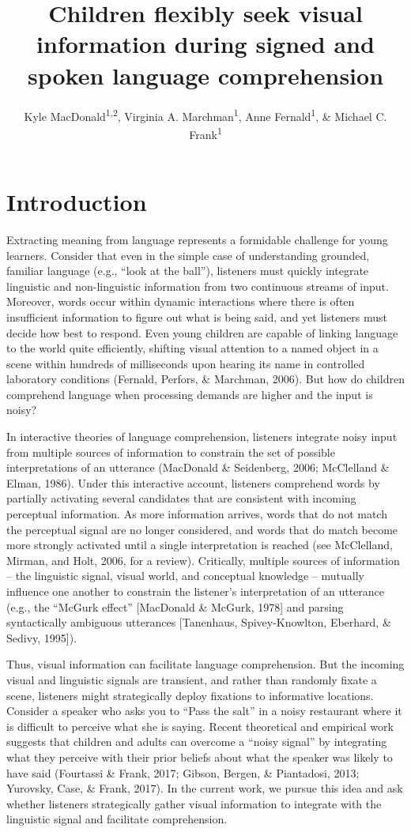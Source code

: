 \documentclass[,man,floatsintext]{apa6}
\title{Children flexibly seek visual information during signed and spoken language comprehension}
\author{Kyle MacDonald\textsuperscript{1,2}, Virginia A. Marchman\textsuperscript{1}, Anne Fernald\textsuperscript{1}, \& Michael C. Frank\textsuperscript{1}}
\date{}
\affiliation{
\vspace{0.5cm}
\textsuperscript{1} Stanford University\\\textsuperscript{2} University of California, Los Angeles}
\begin{document}
\maketitle

\hypertarget{introduction}{%
\section{Introduction}\label{introduction}}

Extracting meaning from language represents a formidable challenge for young learners. Consider that even in the simple case of understanding grounded, familiar language (e.g., \enquote{look at the ball}), listeners must quickly integrate linguistic and non-linguistic information from two continuous streams of input. Moreover, words occur within dynamic interactions where there is often insufficient information to figure out what is being said, and yet listeners must decide how best to respond. Even young children are capable of linking language to the world quite efficiently, shifting visual attention to a named object in a scene within hundreds of milliseconds upon hearing its name in controlled laboratory conditions (Fernald, Perfors, \& Marchman, 2006). But how do children comprehend language when processing demands are higher and the input is noisy?

In interactive theories of language comprehension, listeners integrate noisy input from multiple sources of information to constrain the set of possible interpretations of an utterance (MacDonald \& Seidenberg, 2006; McClelland \& Elman, 1986). Under this interactive account, listeners comprehend words by partially activating several candidates that are consistent with incoming perceptual information. As more information arrives, words that do not match the perceptual signal are no longer considered, and words that do match become more strongly activated until a single interpretation is reached (see McClelland, Mirman, and Holt, 2006, for a review). Critically, multiple sources of information -- the linguistic signal, visual world, and conceptual knowledge -- mutually influence one another to constrain the listener's interpretation of an utterance (e.g., the \enquote{McGurk effect} {[}MacDonald \& McGurk, 1978{]} and parsing syntactically ambiguous utterances {[}Tanenhaus, Spivey-Knowlton, Eberhard, \& Sedivy, 1995{]}).

Thus, visual information can facilitate language comprehension. But the incoming visual and linguistic signals are transient, and rather than randomly fixate a scene, listeners might strategically deploy fixations to informative locations. Consider a speaker who asks you to \enquote{Pass the salt} in a noisy restaurant where it is difficult to perceive what she is saying. Recent theoretical and empirical work suggests that children and adults can overcome a \enquote{noisy signal} by integrating what they perceive with their prior beliefs about what the speaker was likely to have said (Fourtassi \& Frank, 2017; Gibson, Bergen, \& Piantadosi, 2013; Yurovsky, Case, \& Frank, 2017). In the current work, we pursue this idea and ask whether listeners strategically gather visual information to integrate with the linguistic signal and facilitate comprehension.
\end{document}
